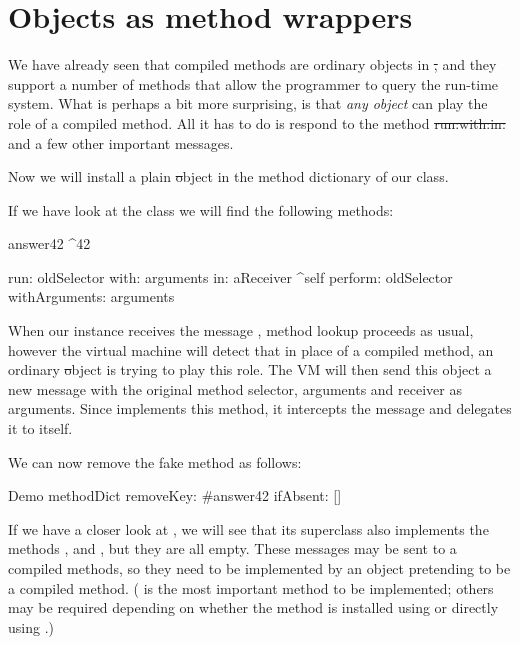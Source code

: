 \documentclass[a4paper,10pt,twoside]{book}
\begin{document}
\section{Objects as method wrappers}
\label{sec:wrapper}

We have already seen that compiled methods are ordinary objects in \st, and they support a number of methods that allow the programmer to query the run-time system.
What is perhaps a bit more surprising, is that \emph{any object} can play the role of a compiled method. All it has to do is respond to the method \st{run:with:in:} and a few other important messages.


Now we will install a plain \st object in the method dictionary of our  class.


If we have look at the class  we will find the following methods:
\begin{code}{}
answer42
	^42

run: oldSelector with: arguments in: aReceiver
	^self perform: oldSelector withArguments: arguments
\end{code}

When our  instance receives the message , method lookup proceeds as usual, however the virtual machine will detect that in place of a compiled method, an ordinary \st object is trying to play this role.
The VM will then send this object a new message  with the original method selector, arguments and receiver as arguments.
Since  implements this method, it intercepts the message and delegates it to itself.

We can now remove the fake method as follows:
\begin{code}{}
Demo methodDict removeKey: #answer42 ifAbsent: []
\end{code}

If we have a closer look at , we will see that its superclass also implements the methods ,  and , but they are all empty.  These messages may be sent to a compiled methods, so they need to be implemented by an object pretending to be a compiled method.  ( is the most important method to be implemented; others may be required depending on whether the method is installed using  or directly using .)
\end{document}
